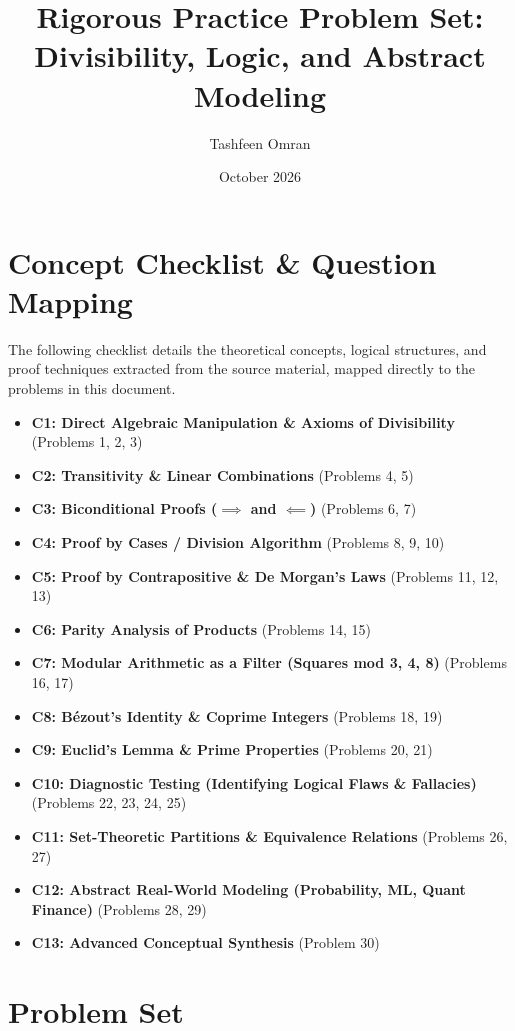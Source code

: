 \documentclass[12pt]{article}
\title{\textbf{Rigorous Practice Problem Set: Divisibility, Logic, and Abstract Modeling}}
\author{Tashfeen Omran}
\date{October 2026}
\begin{document}
\maketitle

\tableofcontents
\newpage

\section{Concept Checklist \& Question Mapping}
\label{sec:checklist_start}
The following checklist details the theoretical concepts, logical structures, and proof techniques extracted from the source material, mapped directly to the problems in this document.

\begin{itemize}
    \item \textbf{C1: Direct Algebraic Manipulation \& Axioms of Divisibility} (Problems 1, 2, 3)
    \item \textbf{C2: Transitivity \& Linear Combinations} (Problems 4, 5)
    \item \textbf{C3: Biconditional Proofs ($\implies$ and $\impliedby$)} (Problems 6, 7)
    \item \textbf{C4: Proof by Cases / Division Algorithm} (Problems 8, 9, 10)
    \item \textbf{C5: Proof by Contrapositive \& De Morgan's Laws} (Problems 11, 12, 13)
    \item \textbf{C6: Parity Analysis of Products} (Problems 14, 15)
    \item \textbf{C7: Modular Arithmetic as a Filter (Squares mod 3, 4, 8)} (Problems 16, 17)
    \item \textbf{C8: B\'ezout's Identity \& Coprime Integers} (Problems 18, 19)
    \item \textbf{C9: Euclid's Lemma \& Prime Properties} (Problems 20, 21)
    \item \textbf{C10: Diagnostic Testing (Identifying Logical Flaws \& Fallacies)} (Problems 22, 23, 24, 25)
    \item \textbf{C11: Set-Theoretic Partitions \& Equivalence Relations} (Problems 26, 27)
    \item \textbf{C12: Abstract Real-World Modeling (Probability, ML, Quant Finance)} (Problems 28, 29)
    \item \textbf{C13: Advanced Conceptual Synthesis} (Problem 30)
\end{itemize}

\newpage

\section{Problem Set}
\end{document}
